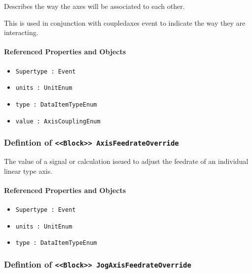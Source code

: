 \FloatBarrier

Describes the way the axes will be associated to each other. 
  
 This is used in conjunction with coupledaxes event to indicate the way they are interacting.

\FloatBarrier
\paragraph{Referenced Properties and Objects}

\begin{itemize}
\item \texttt{Supertype : Event}

\item \texttt{units : UnitEnum}

\item \texttt{type : DataItemTypeEnum}

\item \texttt{value : AxisCouplingEnum}

\end{itemize}
\FloatBarrier
\subsubsection{Defintion of \texttt{<<Block>> AxisFeedrateOverride}}
  \label{type:AxisFeedrateOverride}

\FloatBarrier

The value of a signal or calculation issued to adjust the feedrate of an individual linear type axis.

\FloatBarrier
\paragraph{Referenced Properties and Objects}

\begin{itemize}
\item \texttt{Supertype : Event}

\item \texttt{units : UnitEnum}

\item \texttt{type : DataItemTypeEnum}

\end{itemize}
\FloatBarrier
\subsubsection{Defintion of \texttt{<<Block>> JogAxisFeedrateOverride}}
  \label{type:JogAxisFeedrateOverride}

